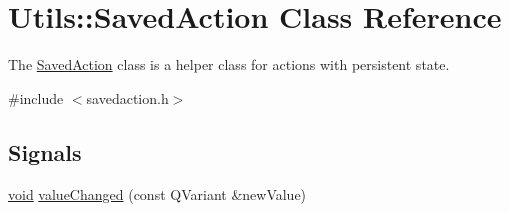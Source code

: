 \hypertarget{class_utils_1_1_saved_action}{\section{\-Utils\-:\-:\-Saved\-Action \-Class \-Reference}
\label{class_utils_1_1_saved_action}
}


\-The \hyperlink{class_utils_1_1_saved_action}{\-Saved\-Action} class is a helper class for actions with persistent state.  




{\ttfamily \#include $<$savedaction.\-h$>$}

\subsection*{\-Signals}
\begin{DoxyCompactItemize}
\item 
\hyperlink{group___u_a_v_objects_plugin_ga444cf2ff3f0ecbe028adce838d373f5c}{void} \hyperlink{class_utils_1_1_saved_action_a7b6126c479043f004cc924df0fc5f8c5}{value\-Changed} (const \-Q\-Variant \&new\-Value)
\end{DoxyCompactItemize}
